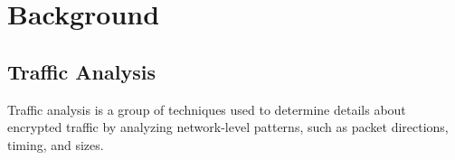 \section{Background}



\subsection{Traffic Analysis}
Traffic analysis is a group of techniques used to determine details about encrypted traffic by analyzing network-level patterns, such as packet directions, timing, and sizes.